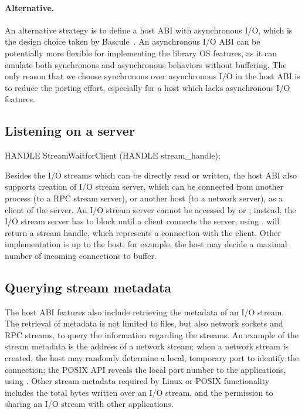 \paragraph{Alternative.}
An alternative strategy is to define a host ABI with asynchronous I/O,
which is the design choice taken by Bascule~\cite{baumann13bascule}.
An asynchronous I/O ABI can be potentially
more flexible for implementing the library OS features,
as it can emulate both synchronous and asynchronous behaviors
without buffering.
The only reason that we choose synchronous over asynchronous I/O
in the host ABI is to reduce the porting effort,
especially for a host which lacks
asynchronous I/O features.



\subsection*{Listening on a server}


\begin{paldef}
HANDLE StreamWaitforClient (HANDLE stream_handle);
\end{paldef} 

Besides the I/O streams which can be directly read or written,
the host ABI also supports creation
of I/O stream server, which can be
connected from another process (to a RPC stream server), or another host (to a network server), as a client of the server.
An I/O stream server cannot be accessed by  or ;
instead, the I/O stream server has to block until a client
connects the server, using .
 will return a stream handle, which represents a connection with the client.
Other implementation
is up to the host: for example,
the host may decide a maximal number of incoming connections to buffer.









\subsection*{Querying stream metadata}

The host ABI features also include retrieving the metadata of an I/O stream.
The retrieval of metadata is not limited to files,
but also network sockets and RPC streams, to query the information regarding the streams.
An example of the stream metadata is the address of a network stream;
when a network stream is created,
the host may randomly determine a local, temporary port to identify the connection;
the POSIX API
reveals the local port number
to the applications,
using .
Other stream metadata required by Linux or POSIX functionality
includes the total bytes written over an I/O stream, and the permission to sharing an I/O stream with other applications.



